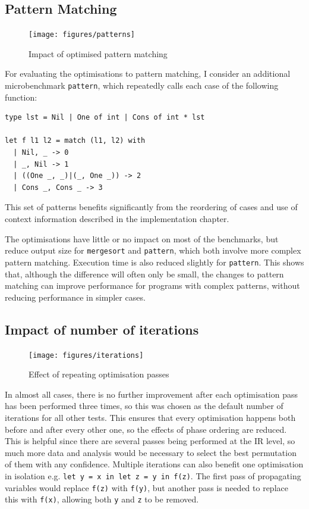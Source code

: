 \subsection{Pattern Matching}
\begin{figure}[H]
\texttt{[image: figures/patterns]}
\vspace{-0.8cm}
\caption{Impact of optimised pattern matching}
 \label{fig:patterns} 
\end{figure}

For evaluating the optimisations to pattern matching, I consider an additional microbenchmark \verb|pattern|, which repeatedly calls each case of the following function:
\begin{verbatim}
type lst = Nil | One of int | Cons of int * lst

let f l1 l2 = match (l1, l2) with
  | Nil, _ -> 0
  | _, Nil -> 1
  | ((One _, _)|(_, One _)) -> 2
  | Cons _, Cons _ -> 3
\end{verbatim}
This set of patterns benefits significantly from the reordering of cases  and use of context information described in the implementation chapter. 




The optimisations have little or no impact on most of the benchmarks, but reduce output size for \verb|mergesort| and \verb|pattern|, which both involve more complex pattern matching. Execution time is also reduced slightly for \verb|pattern|. This shows that, although the difference will often only be small, the changes to pattern matching can improve performance for programs with complex patterns, without reducing performance in simpler cases.

\subsection{Impact of number of iterations}

\begin{figure}[H]
\hfill
\texttt{[image: figures/iterations]} \hfill
\vspace{-0.3cm}
\caption{Effect of repeating optimisation passes}
 \label{fig:iterations} 
\end{figure}

In almost all cases, there is no further improvement after each optimisation pass has been performed three times, so this was chosen as the default number of iterations for all other tests. This ensures that every optimisation happens both before and after every other one, so the effects of phase ordering are reduced. This is helpful since there are several passes being performed at the IR level, so much more data and analysis would be necessary to select the best permutation of them with any confidence.
Multiple iterations can also benefit one optimisation in isolation e.g. \verb|let y = x in let z = y in f(z)|. The first pass of propagating variables would replace \verb|f(z)| with \verb|f(y)|, but another pass is needed to replace this with \verb|f(x)|, allowing both \verb|y| and \verb|z| to be removed.

